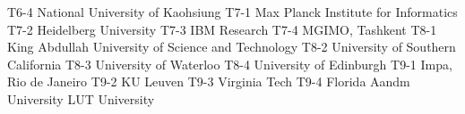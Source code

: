 \begin{multicols}{2}
{T6-4}
{}
{National University of Kaohsiung}
{T7-1}
{}
{Max Planck Institute for Informatics}
{T7-2}
{}
{Heidelberg University}
{T7-3}
{}
{IBM Research}
{T7-4}
{}
{MGIMO, Tashkent}
{T8-1}
{}
{King Abdullah University of Science and Technology}
{T8-2}
{}
{University of Southern California}
{T8-3}
{}
{University of Waterloo}
{T8-4}
{}
{University of Edinburgh}
{T9-1}
{}
{Impa, Rio de Janeiro}
{T9-2}
{}
{KU Leuven}
{T9-3}
{}
{Virginia Tech}
{T9-4}
{}
{Florida Aandm University}
{}
{}
{LUT University}
{}
{}
\end{multicols}

